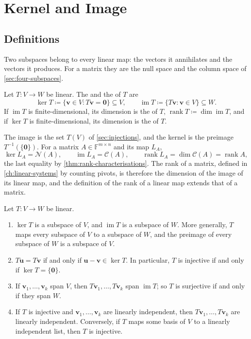 \section{Kernel and Image}
\label{sec:kernel-image}

\subsection{Definitions}

Two subspaces belong to every linear map: the vectors it annihilates and the vectors it produces. For a matrix they are the null space and the column space of \cref{sec:four-subspaces}.

\begin{definition}
\label{def:kernel-image}
Let $T\colon V\to W$ be linear. The  and the  of $T$ are
\[
\ker T\coloneqq\{\mathbf v\in V: T\mathbf v=\mathbf 0\}\subseteq V,\qquad\operatorname{im}T\coloneqq\{T\mathbf v: \mathbf v\in V\}\subseteq W .
\]
If $\operatorname{im}T$ is finite-dimensional, its dimension is the  of $T$, $\operatorname{rank}T\coloneqq\dim\operatorname{im}T$, and if $\ker T$ is finite-dimensional, its dimension is the  of $T$.
\end{definition}

The image is the set $T(V)$ of \cref{sec:injections}, and the kernel is the preimage $T^{-1}(\{\mathbf 0\})$. For a matrix $A\in\mathbb F^{m\times n}$ and its map $L_A$,
\[
\ker L_A=\mathcal N(A),\qquad\operatorname{im}L_A=\mathcal C(A),\qquad\operatorname{rank}L_A=\dim\mathcal C(A)=\operatorname{rank}A,
\]
the last equality by \cref{thm:rank-characterisations}. The rank of a matrix, defined in \cref{ch:linear-systems} by counting pivots, is therefore the dimension of the image of its linear map, and the definition of the rank of a linear map extends that of a matrix.

\begin{proposition}
\label{prop:kernel-image}
Let $T\colon V\to W$ be linear.
\begin{enumerate}
\item $\ker T$ is a subspace of $V$, and $\operatorname{im}T$ is a subspace of $W$. More generally, $T$ maps every subspace of $V$ to a subspace of $W$, and the preimage of every subspace of $W$ is a subspace of $V$.
\item $T\mathbf u=T\mathbf v$ if and only if $\mathbf u-\mathbf v\in\ker T$. In particular, $T$ is injective if and only if $\ker T=\{\mathbf 0\}$.
\item If $\mathbf v_1,\ldots,\mathbf v_k$ span $V$, then $T\mathbf v_1,\ldots,T\mathbf v_k$ span $\operatorname{im}T$; so $T$ is surjective if and only if they span $W$.
\item If $T$ is injective and $\mathbf v_1,\ldots,\mathbf v_k$ are linearly independent, then $T\mathbf v_1,\ldots,T\mathbf v_k$ are linearly independent. Conversely, if $T$ maps some basis of $V$ to a linearly independent list, then $T$ is injective.
\end{enumerate}
\end{proposition}

